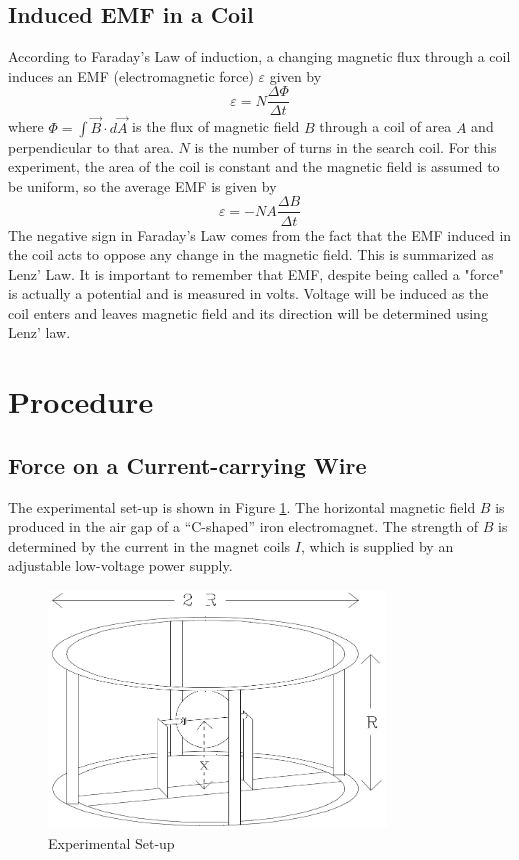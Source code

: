 \subsection{Induced EMF in a Coil}
According to Faraday's Law of induction, a changing magnetic flux through a coil induces an EMF (electromagnetic force) $\varepsilon$ given by
\begin{equation}
  \varepsilon=N\frac{\Delta \Phi}{\Delta t}
\end{equation}
where $\Phi = \int \vec{B} \cdot d \vec{A}$ is the flux of magnetic field $B$ through a coil of area $A$ and perpendicular to that area. $N$ is the number of turns in the search coil. For this experiment, the area of the coil is constant and the magnetic field is assumed to be uniform, so the average EMF is given by
\begin{equation}
  \varepsilon= -NA\frac{\Delta B}{\Delta t}
\end{equation}
The negative sign in Faraday's Law comes from the fact  that the EMF induced in the coil acts to oppose any change in the magnetic field. This is summarized as Lenz' Law. It is important to remember that EMF, despite being called a "force" is actually a potential and is measured in volts. Voltage will be induced as the coil enters and leaves magnetic field and its direction will be determined using Lenz' law.

\section{Procedure}
\subsection{Force on a Current-carrying Wire}

The experimental set-up is shown in Figure {\ref{fig:set-up}}. The horizontal magnetic field $B$ is produced in the air gap of a ``C-shaped'' iron electromagnet. The strength of $B$ is determined by the current in the magnet coils $I$, which is supplied by an adjustable low-voltage power supply.\myskip
\begin{figure}[h]
\centering
\includegraphics[width=0.8\textwidth]{./Exp5/pic/image2.png}
\caption{Experimental Set-up}
\label{fig:set-up}
\end{figure}

